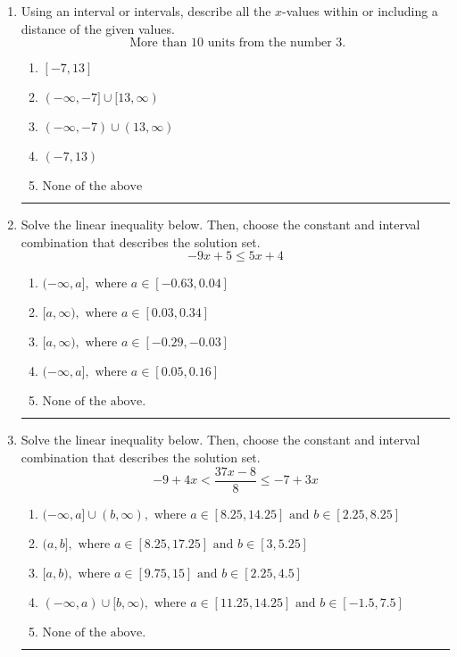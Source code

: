 \documentclass[14pt]{extbook}
\newcommand{\litem}[1]{\item#1\hspace*{-1cm}\rule{\textwidth}{0.4pt}}
\begin{document}
\begin{enumerate}
\litem{
Using an interval or intervals, describe all the $x$-values within or including a distance of the given values.\[ \text{ More than } 10 \text{ units from the number } 3. \]\begin{enumerate}[label=\Alph*.]
\item \( [-7, 13] \)
\item \( (-\infty, -7] \cup [13, \infty) \)
\item \( (-\infty, -7) \cup (13, \infty) \)
\item \( (-7, 13) \)
\item \( \text{None of the above} \)

\end{enumerate} }
\litem{
Solve the linear inequality below. Then, choose the constant and interval combination that describes the solution set.\[ -9x + 5 \leq 5x + 4 \]\begin{enumerate}[label=\Alph*.]
\item \( (-\infty, a], \text{ where } a \in [-0.63, 0.04] \)
\item \( [a, \infty), \text{ where } a \in [0.03, 0.34] \)
\item \( [a, \infty), \text{ where } a \in [-0.29, -0.03] \)
\item \( (-\infty, a], \text{ where } a \in [0.05, 0.16] \)
\item \( \text{None of the above}. \)

\end{enumerate} }
\litem{
Solve the linear inequality below. Then, choose the constant and interval combination that describes the solution set.\[ -9 + 4 x < \frac{37 x - 8}{8} \leq -7 + 3 x \]\begin{enumerate}[label=\Alph*.]
\item \( (-\infty, a] \cup (b, \infty), \text{ where } a \in [8.25, 14.25] \text{ and } b \in [2.25, 8.25] \)
\item \( (a, b], \text{ where } a \in [8.25, 17.25] \text{ and } b \in [3, 5.25] \)
\item \( [a, b), \text{ where } a \in [9.75, 15] \text{ and } b \in [2.25, 4.5] \)
\item \( (-\infty, a) \cup [b, \infty), \text{ where } a \in [11.25, 14.25] \text{ and } b \in [-1.5, 7.5] \)
\item \( \text{None of the above.} \)


\end{enumerate}}
\end{enumerate}
\end{document}
